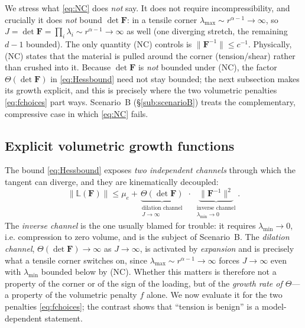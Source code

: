 We stress what \eqref{eq:NC} does \emph{not} say. It does not require incompressibility, and crucially it does
\emph{not} bound $\det\bm{F}$: in a tensile corner $\lambda_{\max}\sim r^{\alpha-1}\to\infty$, so
$J=\det\bm{F}=\prod_i\lambda_i\sim r^{\alpha-1}\to\infty$ as well (one diverging stretch, the remaining $d-1$ bounded).
The only quantity (NC) controls is
$\|\bm{F}^{-1}\|\le c^{-1}$. Physically, (NC) states that the material is pulled around the corner (tension/shear)
rather than crushed into it. Because $\det\bm{F}$ is \emph{not} bounded under (NC), the factor $\Theta(\det\bm{F})$ in
\eqref{eq:Hessbound} need not stay bounded; the next subsection makes its growth explicit, and this is precisely where
the two volumetric penalties \eqref{eq:fchoices} part ways. Scenario~B (\S\ref{sub:scenarioB}) treats the
complementary, compressive case in which \eqref{eq:NC} fails.

\subsection{Explicit volumetric growth functions}
\label{sub:growth}

The bound \eqref{eq:Hessbound} exposes \emph{two independent channels} through which the tangent can diverge, and they
are kinematically decoupled:
\begin{equation}
    \label{eq:twochannels}
    \|\mathbb{L}(\bm{F})\| \le \mu_e
    + \underbrace{\Theta(\det\bm{F})}_{\substack{\text{dilation channel}\\ J\to\infty}}\;\cdot\;
    \underbrace{\|\bm{F}^{-1}\|^{2}}_{\substack{\text{inverse channel}\\ \lambda_{\min}\to 0}} .
\end{equation}
The \emph{inverse channel} is the one usually blamed for trouble: it requires $\lambda_{\min}\to0$, i.e. compression to
zero volume, and is the subject of Scenario~B. The \emph{dilation channel}, $\Theta(\det\bm{F})\to\infty$ as
$J\to\infty$, is activated by \emph{expansion} and is precisely what a tensile corner switches on, since
$\lambda_{\max}\sim r^{\alpha-1}\to\infty$ forces $J\to\infty$ even with $\lambda_{\min}$ bounded below by (NC). Whether
this matters is therefore not a property of the corner or of the sign of the loading, but of the \emph{growth rate of
    $\Theta$}---a property of the volumetric penalty $f$ alone. We now evaluate it for the two penalties
\eqref{eq:fchoices}; the contrast shows that ``tension is benign'' is a model-dependent statement.


